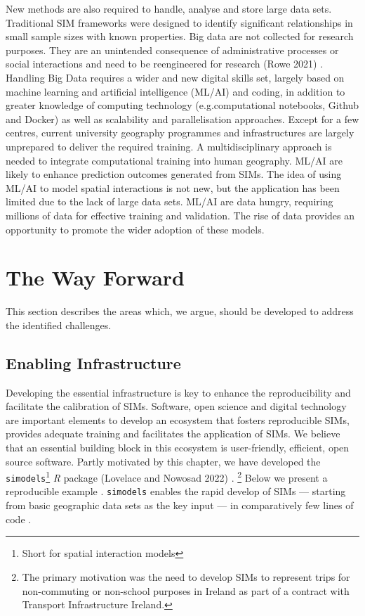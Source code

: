 \documentclass[11pt,letterpaper]{article}
\begin{document}
New methods are also required to handle, analyse and store large data sets.
Traditional SIM frameworks were designed to identify significant relationships in small sample sizes with known properties.
Big data are not collected for research purposes.
They are an unintended consequence of administrative processes or social interactions and need to be reengineered for research (Rowe 2021) .
Handling Big Data requires a wider and new digital skills set, largely based on machine learning and artificial intelligence (ML/AI) and coding, in addition to greater knowledge of computing technology (e.g.computational notebooks, Github and Docker) as well as scalability and parallelisation approaches.
Except for a few centres, current university geography programmes and infrastructures are largely unprepared to deliver the required training.
A multidisciplinary approach is needed to integrate computational training into human geography.
ML/AI are likely to enhance prediction outcomes generated from SIMs.
The idea of using ML/AI to model spatial interactions is not new, but the application has been limited due to the lack of large data sets.
ML/AI are data hungry, requiring millions of data for effective training and validation.
The rise of data provides an opportunity to promote the wider adoption of these models.

\hypertarget{the-way-forward}{%
\section{The Way Forward}\label{the-way-forward}}

This section describes the areas which, we argue, should be developed to address the identified challenges.

\hypertarget{enabling-infrastructure}{%
\subsection{Enabling Infrastructure}\label{enabling-infrastructure}}

Developing the essential infrastructure is key to enhance the reproducibility and facilitate the calibration of SIMs.
Software, open science and digital technology are important elements to develop an ecosystem that fosters reproducible SIMs, provides adequate training and facilitates the application of SIMs.
We believe that an essential building block in this ecosystem is user-friendly, efficient, open source software.
Partly motivated by this chapter, we have developed the \texttt{simodels}\footnote{Short for spatial interaction models} \emph{R} package (Lovelace and Nowosad 2022) .
\footnote{The primary motivation was the need to develop SIMs to represent trips for non-commuting or non-school purposes in Ireland as part of a contract with Transport Infrastructure Ireland.} Below we present a reproducible example
. \texttt{simodels} enables the rapid develop of SIMs --- starting from basic geographic data sets as the key input --- in comparatively few lines of code
.
\end{document}
